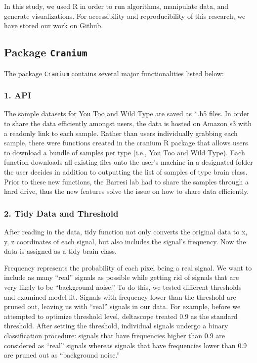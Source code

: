 \documentclass[10pt,letterpaper]{article}
\begin{document}
In this study, we used R in order to run algorithms, manipulate data,
and generate visualizations. For accessibility and reproducibility of
this research, we have stored our work on Github.

\subsection{\texorpdfstring{Package
\texttt{Cranium}}{Package Cranium}}\label{package-cranium}

The package \texttt{Cranium} contains several major functionalities
listed below:

\subsubsection{1. API}\label{api}

The sample datasets for You Too and Wild Type are saved as *.h5 files.
In order to share the data efficiently amongst users, the data is hosted
on Amazon s3 with a readonly link to each sample. Rather than users
individually grabbing each sample, there were functions created in the
cranium R package that allows users to download a bundle of samples per
type (i.e., You Too and Wild Type). Each function downloads all existing
files onto the user's machine in a designated folder the user decides in
addition to outputting the list of samples of type brain class. Prior to
these new functions, the Barresi lab had to share the samples through a
hard drive, thus the new features solve the issue on how to share data
efficiently.

\subsubsection{2. Tidy Data and
Threshold}\label{tidy-data-and-threshold}

After reading in the data, tidy function not only converts the original
data to x, y, z coordinates of each signal, but also includes the
signal's frequency. Now the data is assigned as a tidy brain class.

Frequency represents the probability of each pixel being a real signal.
We want to include as many ``real'' signals as possible while getting
rid of signals that are very likely to be ``background noise.'' To do
this, we tested different thresholds and examined model fit. Signals
with frequency lower than the threshold are pruned out, leaving us with
``real'' signals in our data. For example, before we attempted to
optimize threshold level, deltascope treated 0.9 as the standard
threshold. After setting the threshold, individual signals undergo a
binary classification procedure: signals that have frequencies higher
than 0.9 are considered as ``real'' signals whereas signals that have
frequencies lower than 0.9 are pruned out as ``background noise.''
\end{document}
